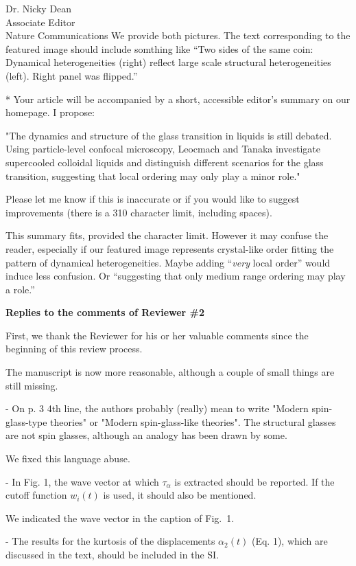 \documentclass[a4paper, rebuttal, parskip=true, firsthead=false, fromemail=true, foldmarks=false]{scrlttr2}
\begin{document}
\begin{letter}{Dr. Nicky Dean\\
Associate Editor\\
Nature Communications}
We provide both pictures. The text corresponding to the featured image should include somthing like ``Two sides of the same coin: Dynamical heterogeneities (right) reflect large scale structural heterogeneities (left). Right panel was flipped.''

\begin{quotationi}
* Your article will be accompanied by a short, accessible editor's summary on our homepage. I propose:

"The dynamics and structure of the glass transition in liquids is still debated. Using particle-level confocal microscopy, Leocmach and Tanaka investigate supercooled colloidal liquids and distinguish different scenarios for the glass transition, suggesting that local ordering may only play a minor role."

Please let me know if this is inaccurate or if you would like to suggest improvements (there is a 310 character limit, including spaces).
\end{quotationi}
This summary fits, provided the character limit. However it may confuse the reader, especially if our featured image represents crystal-like order fitting the pattern of dynamical heterogeneities. Maybe adding ``\textit{very} local order'' would induce less confusion. Or ``suggesting that only medium range ordering may play a role.''

\clearpage
\textbf{Replies to the comments of Reviewer \#2}

First, we thank the Reviewer for his or her valuable comments since the beginning of this review process.

\begin{quotationi}
The manuscript is now more reasonable, although a couple of small things are still missing.

- On p. 3 4th line, the authors probably (really) mean to write "Modern spin-glass-type theories" or "Modern spin-glass-like theories". The structural glasses are not spin glasses, although an analogy has been drawn by some.
\end{quotationi}
We fixed this language abuse.

\begin{quotationi}
- In Fig. 1, the wave vector at which $\tau_\alpha$ is extracted should be reported. If the cutoff function $w_i(t)$ is used, it should also be mentioned.
\end{quotationi}
We indicated the wave vector in the caption of Fig.~1.

\begin{quotationi}
- The results for the kurtosis of the displacements $\alpha_2(t)$ (Eq. 1), which are discussed in the text, should be included in the SI.
\end{quotationi}


\end{letter}
\end{document}
